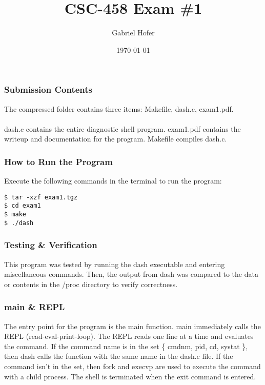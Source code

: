 \documentclass[12pt]{article}
\begin{document}
\title{CSC-458 Exam \#1}
\author{Gabriel Hofer}
\date{\today}
\maketitle
\noindent \subsubsection*{Submission Contents} 
\noindent The compressed folder contains three items: {\ttfamily Makefile}, {\ttfamily dash.c}, {\ttfamily exam1.pdf}. \\ \\ {\ttfamily dash.c} contains the entire diagnostic shell program. {\ttfamily exam1.pdf} contains the writeup and documentation for the program. {\ttfamily Makefile} compiles {\ttfamily dash.c}. 

\noindent \subsubsection*{How to Run the Program} \par
Execute the following commands in the terminal to run the program: 
\begin{verbatim}
$ tar -xzf exam1.tgz
$ cd exam1
$ make 
$ ./dash
\end{verbatim}

\noindent \subsubsection*{Testing \& Verification} \par
This program was tested by running the {\ttfamily dash} executable and entering miscellaneous commands. Then, the output from {\ttfamily dash} was compared to the data or contents in the {\ttfamily /proc} directory to verify correctness.

\noindent \subsubsection*{main \& REPL} \par
The entry point for the program is the {\ttfamily main} function. {\ttfamily main} immediately calls the REPL (read-eval-print-loop). The REPL reads one line at a time and evaluates the command. If the command name is in the set \{ {\ttfamily cmdnm}, {\ttfamily pid}, {\ttfamily cd}, {\ttfamily systat} \}, then dash calls the function with the same name in the dash.c file. If the command isn't in the set, then {\ttfamily fork} and {\ttfamily execvp} are used to execute the command with a child process. The shell is terminated when the {\ttfamily exit} command is entered.
\end{document}
